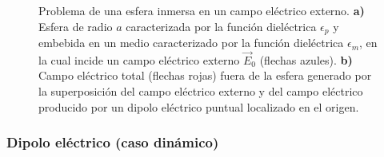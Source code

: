 \begin{figure}[H]
	\centering
	\caption{Problema de una esfera inmersa en un campo eléctrico externo. \textbf{a)} Esfera de radio $a$ caracterizada por la función dieléctrica $\epsilon_p$ y embebida en un medio caracterizado por la función dieléctrica $\epsilon_m$, en la cual incide un campo eléctrico externo $\Vec{E}_0$ (flechas azules). \textbf{b)} Campo eléctrico total (flechas rojas) fuera de la esfera generado por la superposición del campo eléctrico externo y del campo eléctrico producido por un dipolo eléctrico puntual localizado en el origen.}
	\label{steady_state}
\end{figure}
 

\subsubsection{Dipolo eléctrico (caso dinámico)}


